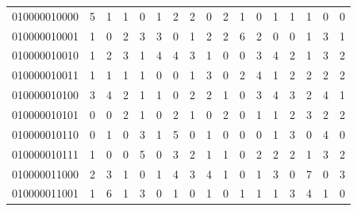 \documentclass[10pt,a4paper]{article}
\begin{document}
\begin{longtable}{ |c|c|c|c|c|c|c|c|c|c|c|c|c|c|c|c|c| }
    010000010000              & 5                            & 1                                & 1                            & 0                              & 1   & 2   & 2   & 0   & 2   & 1   & 0   & 1   & 1   & 1   & 0   & 0   \\
    010000010001              & 1                            & 0                                & 2                            & 3                              & 3   & 0   & 1   & 2   & 2   & 6   & 2   & 0   & 0   & 1   & 3   & 1   \\
    010000010010              & 1                            & 2                                & 3                            & 1                              & 4   & 4   & 3   & 1   & 0   & 0   & 3   & 4   & 2   & 1   & 3   & 2   \\
    010000010011              & 1                            & 1                                & 1                            & 1                              & 0   & 0   & 1   & 3   & 0   & 2   & 4   & 1   & 2   & 2   & 2   & 2   \\
    010000010100              & 3                            & 4                                & 2                            & 1                              & 1   & 0   & 2   & 2   & 1   & 0   & 3   & 4   & 3   & 2   & 4   & 1   \\
    010000010101              & 0                            & 0                                & 2                            & 1                              & 0   & 2   & 1   & 0   & 2   & 0   & 1   & 1   & 2   & 3   & 2   & 2   \\
    010000010110              & 0                            & 1                                & 0                            & 3                              & 1   & 5   & 0   & 1   & 0   & 0   & 0   & 1   & 3   & 0   & 4   & 0   \\
    010000010111              & 1                            & 0                                & 0                            & 5                              & 0   & 3   & 2   & 1   & 1   & 0   & 2   & 2   & 2   & 1   & 3   & 2   \\
    010000011000              & 2                            & 3                                & 1                            & 0                              & 1   & 4   & 3   & 4   & 1   & 0   & 1   & 3   & 0   & 7   & 0   & 3   \\
    010000011001              & 1                            & 6                                & 1                            & 3                              & 0   & 1   & 0   & 1   & 0   & 1   & 1   & 1   & 3   & 4   & 1   & 0   \\

\end{longtable}
\end{document}
